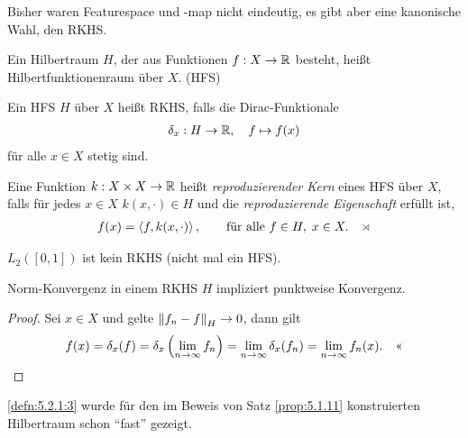 Bisher waren Featurespace und -map nicht eindeutig, es gibt aber eine kanonische
Wahl, den RKHS.

\begin{defn}
\label{defn:5.2.1}
\begin{defnenum}
\item Ein Hilbertraum $H$, der aus Funktionen $f: X\to\R$ besteht, heißt
Hilbertfunktionenraum über $X$. (HFS)
\item Ein HFS $H$ über $X$ heißt RKHS, falls die Dirac-Funktionale
\begin{align*}
\delta_x: H\to\R,\quad f\mapsto f(x)
\end{align*}
für alle $x\in X$ stetig sind.
\item\label{defn:5.2.1:3} Eine Funktion $k: X\times X\to \R$ heißt
\emph{reproduzierender Kern}
eines HFS über $X$, falls für jedes $x\in X$ $k(x,\cdot)\in H$ und
die \emph{reproduzierende Eigenschaft} erfüllt ist,
\begin{align*}
f(x) = \lin{f,k(x,\cdot)},\qquad \text{für alle } f\in H,\; x\in X.\fishhere
\end{align*}
\end{defnenum}
\end{defn}

\begin{bem*}[Bemkerungen.]
\begin{bemenum}
\item $L_2([0,1])$ ist kein RKHS (nicht mal ein HFS).
\item Norm-Konvergenz in einem RKHS $H$ impliziert punktweise Konvergenz.
\begin{proof}
Sei $x\in X$ und gelte $\norm{f_n-f}_H\to 0$, dann gilt
\begin{align*}
f(x) = \delta_x(f) =
\delta_x\left(\lim\limits_{n\to\infty} f_n\right) =
\lim\limits_{n\to\infty} \delta_x(f_n) 
= \lim\limits_{n\to\infty} f_n(x).\qedhere
\end{align*}
\end{proof}
\item \ref{defn:5.2.1:3} wurde für den im Beweis von Satz \ref{prop:5.1.11}
konstruierten Hilbertraum schon "`fast"'
gezeigt.\maphere
\end{bemenum}
\end{bem*}

